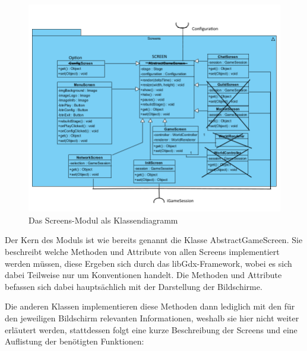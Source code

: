 \documentclass[fontsize=12pt,paper=a4,twoside]{scrartcl}
\begin{document}
\begin{figure}[h]
\centering
\includegraphics[width=1.0\linewidth]{ScreenClass}
\caption{Das Screens-Modul als Klassendiagramm}
\label{fig:ScreenClass}
\end{figure}

Der Kern des Moduls ist wie bereits genannt die Klasse AbstractGameScreen. Sie beschreibt welche Methoden und Attribute von allen Screens implementiert werden müssen, diese Ergeben sich durch das libGdx-Framework, wobei es sich dabei Teilweise nur um Konventionen handelt. Die Methoden und Attribute befassen sich dabei hauptsächlich mit der Darstellung der Bildschirme.

Die anderen Klassen implementieren diese Methoden dann lediglich mit den für den jeweiligen Bildschirm relevanten Informationen, weshalb sie hier nicht weiter erläutert werden, stattdessen folgt eine kurze Beschreibung der Screens und eine Auflistung der benötigten Funktionen:
\end{document}
